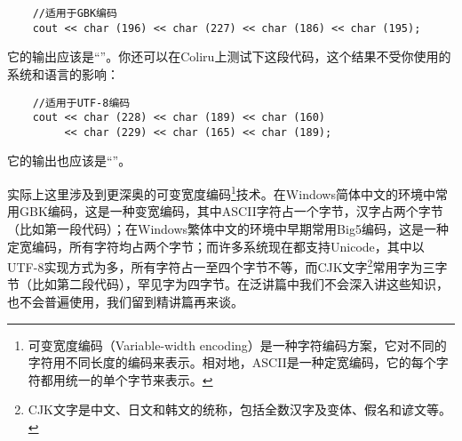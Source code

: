 \begin{lstlisting}
    //适用于GBK编码
    cout << char (196) << char (227) << char (186) << char (195);
\end{lstlisting}
它的输出应该是``''。你还可以在Coliru上测试下这段代码，这个结果不受你使用的系统和语言的影响：
\begin{lstlisting}
    //适用于UTF-8编码
    cout << char (228) << char (189) << char (160)
         << char (229) << char (165) << char (189);
\end{lstlisting}
它的输出也应该是``''。\par
实际上这里涉及到更深奥的可变宽度编码\footnote{可变宽度编码（Variable-width encoding）是一种字符编码方案，它对不同的字符用不同长度的编码来表示。相对地，ASCII是一种定宽编码，它的每个字符都用统一的单个字节来表示。}技术。在Windows简体中文的环境中常用GBK编码，这是一种变宽编码，其中ASCII字符占一个字节，汉字占两个字节（比如第一段代码）；在Windows繁体中文的环境中早期常用Big5编码，这是一种定宽编码，所有字符均占两个字节；而许多系统现在都支持Unicode，其中以UTF-8实现方式为多，所有字符占一至四个字节不等，而CJK文字\footnote{CJK文字是中文、日文和韩文的统称，包括全数汉字及变体、假名和谚文等。}常用字为三字节（比如第二段代码），罕见字为四字节。在泛讲篇中我们不会深入讲这些知识，也不会普遍使用，我们留到精讲篇再来谈。\par
